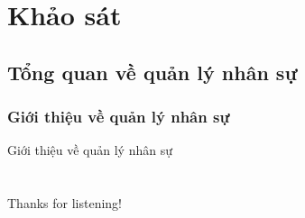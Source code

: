 \documentclass{beamer}
\begin{document}
\section{Khảo sát}
\subsection{Tổng quan về quản lý nhân sự}
\subsubsection{Giới thiệu về quản lý nhân sự}
\begin{frame}{Giới thiệu về quản lý nhân sự}
\end{frame}

\section*{}
\begin{frame}{}
\centering
\Huge{Thanks for listening!}
\end{frame}
\end{document}
